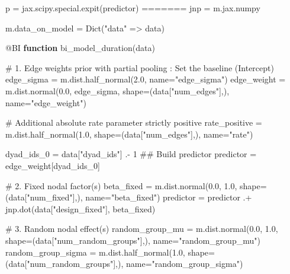 \documentclass[
  letterpaper,
  DIV=11,
  numbers=noendperiod]{scrartcl}
\newenvironment{Shaded}{\begin{snugshade}}{\end{snugshade}}
\newcommand{\CommentTok}[1]{\textcolor[rgb]{0.37,0.37,0.37}{#1}}
\newcommand{\FloatTok}[1]{\textcolor[rgb]{0.68,0.00,0.00}{#1}}
\newcommand{\FunctionTok}[1]{\textcolor[rgb]{0.28,0.35,0.67}{#1}}
\newcommand{\KeywordTok}[1]{\textcolor[rgb]{0.00,0.23,0.31}{\textbf{#1}}}
\newcommand{\NormalTok}[1]{\textcolor[rgb]{0.00,0.23,0.31}{#1}}
\newcommand{\OperatorTok}[1]{\textcolor[rgb]{0.37,0.37,0.37}{#1}}
\newcommand{\PreprocessorTok}[1]{\textcolor[rgb]{0.68,0.00,0.00}{#1}}
\newcommand{\StringTok}[1]{\textcolor[rgb]{0.13,0.47,0.30}{#1}}
\begin{document}
\begin{Shaded}
\begin{Highlighting}[]
\NormalTok{    p }\OperatorTok{=}\NormalTok{ jax.scipy.special.}\FunctionTok{expit}\NormalTok{(predictor)}
\OperatorTok{=======}
\NormalTok{jnp }\OperatorTok{=}\NormalTok{ m.jax.numpy}

\NormalTok{m.data\_on\_model }\OperatorTok{=} \FunctionTok{Dict}\NormalTok{(}\StringTok{"data"} \OperatorTok{=\textgreater{}}\NormalTok{ data)}

\PreprocessorTok{@BI} \KeywordTok{function} \FunctionTok{bi\_model\_duration}\NormalTok{(data)}

    \CommentTok{\# 1. Edge weights prior with partial pooling : Set the baseline (Intercept)}
\NormalTok{    edge\_sigma }\OperatorTok{=}\NormalTok{ m.dist.}\FunctionTok{half\_normal}\NormalTok{(}\FloatTok{2.0}\NormalTok{, name}\OperatorTok{=}\StringTok{"edge\_sigma"}\NormalTok{)}
\NormalTok{    edge\_weight }\OperatorTok{=}\NormalTok{ m.dist.}\FunctionTok{normal}\NormalTok{(}\FloatTok{0.0}\NormalTok{, edge\_sigma, shape}\OperatorTok{=}\NormalTok{(data[}\StringTok{"num\_edges"}\NormalTok{],), name}\OperatorTok{=}\StringTok{"edge\_weight"}\NormalTok{)}
    
    \CommentTok{\# Additional absolute rate parameter strictly positive}
\NormalTok{    rate\_positive }\OperatorTok{=}\NormalTok{ m.dist.}\FunctionTok{half\_normal}\NormalTok{(}\FloatTok{1.0}\NormalTok{, shape}\OperatorTok{=}\NormalTok{(data[}\StringTok{"num\_edges"}\NormalTok{],), name}\OperatorTok{=}\StringTok{"rate"}\NormalTok{)}
    
\NormalTok{    dyad\_ids\_0 }\OperatorTok{=}\NormalTok{ data[}\StringTok{"dyad\_ids"}\NormalTok{] }\OperatorTok{.{-}} \FloatTok{1}
    \CommentTok{\#\# Build predictor}
\NormalTok{    predictor }\OperatorTok{=}\NormalTok{ edge\_weight[dyad\_ids\_0]}
    
    \CommentTok{\# 2. Fixed nodal factor(s)}
\NormalTok{    beta\_fixed }\OperatorTok{=}\NormalTok{ m.dist.}\FunctionTok{normal}\NormalTok{(}\FloatTok{0.0}\NormalTok{, }\FloatTok{1.0}\NormalTok{, shape}\OperatorTok{=}\NormalTok{(data[}\StringTok{"num\_fixed"}\NormalTok{],), name}\OperatorTok{=}\StringTok{"beta\_fixed"}\NormalTok{)}
\NormalTok{    predictor }\OperatorTok{=}\NormalTok{ predictor }\OperatorTok{.+}\NormalTok{ jnp.}\FunctionTok{dot}\NormalTok{(data[}\StringTok{"design\_fixed"}\NormalTok{], beta\_fixed)}

    \CommentTok{\# 3. Random nodal effect(s)}
\NormalTok{    random\_group\_mu }\OperatorTok{=}\NormalTok{ m.dist.}\FunctionTok{normal}\NormalTok{(}\FloatTok{0.0}\NormalTok{, }\FloatTok{1.0}\NormalTok{, shape}\OperatorTok{=}\NormalTok{(data[}\StringTok{"num\_random\_groups"}\NormalTok{],), name}\OperatorTok{=}\StringTok{"random\_group\_mu"}\NormalTok{)}
\NormalTok{    random\_group\_sigma }\OperatorTok{=}\NormalTok{ m.dist.}\FunctionTok{half\_normal}\NormalTok{(}\FloatTok{1.0}\NormalTok{, shape}\OperatorTok{=}\NormalTok{(data[}\StringTok{"num\_random\_groups"}\NormalTok{],), name}\OperatorTok{=}\StringTok{"random\_group\_sigma"}\NormalTok{)}
    

\end{Highlighting}
\end{Shaded}
\end{document}
